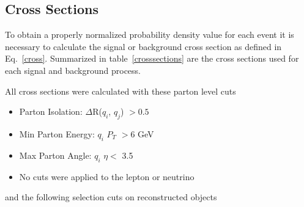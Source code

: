 

\subsection{Cross Sections}

To obtain a properly normalized probability density value for each event it is
necessary to calculate the signal or background cross section as defined in
Eq.~\ref{cross}. Summarized in table~\ref{crosssections} are the cross
sections used for each signal and background process.

All cross sections were calculated with these parton level cuts

\begin{itemize}
\item Parton Isolation: $\Delta$R($q_{i}$, $q_{j}$) $> 0.5$
\item Min Parton Energy: $q_{i}$ $P_{T}$ $> 6$ GeV
\item Max Parton Angle: $q_{i}$ $\eta <$ 3.5
\item No cuts were applied to the lepton or neutrino
\end{itemize}

and the following selection cuts on reconstructed objects

